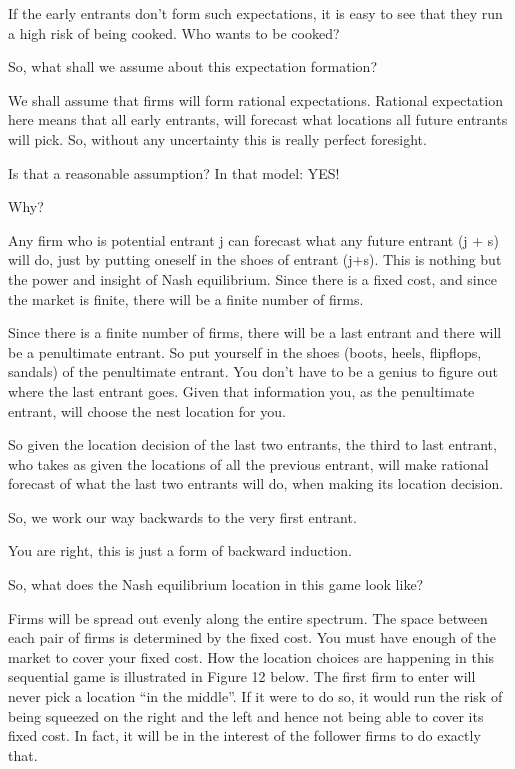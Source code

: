 \documentclass[
]{book}
\begin{document}
If the early entrants don't form such expectations, it is easy to see that they run a high risk of being cooked. Who wants to be cooked?

So, what shall we assume about this expectation formation?

We shall assume that firms will form rational expectations. Rational expectation here means that all early entrants, will forecast what locations all future entrants will pick. So, without any uncertainty this is really perfect foresight.

Is that a reasonable assumption? In that model: YES!

Why?

Any firm who is potential entrant j can forecast what any future entrant (j + s) will do, just by putting oneself in the shoes of entrant (j+s). This is nothing but the power and insight of Nash equilibrium. Since there is a fixed cost, and since the market is finite, there will be a finite number of firms.

Since there is a finite number of firms, there will be a last entrant and there will be a penultimate entrant. So put yourself in the shoes (boots, heels, flipflops, sandals) of the penultimate entrant. You don't have to be a genius to figure out where the last entrant goes. Given that information you, as the penultimate entrant, will choose the nest location for you.

So given the location decision of the last two entrants, the third to last entrant, who takes as given the locations of all the previous entrant, will make rational forecast of what the last two entrants will do, when making its location decision.

So, we work our way backwards to the very first entrant.

You are right, this is just a form of backward induction.

So, what does the Nash equilibrium location in this game look like?

Firms will be spread out evenly along the entire spectrum. The space between each pair of firms is determined by the fixed cost. You must have enough of the market to cover your fixed cost. How the location choices are happening in this sequential game is illustrated in Figure 12 below. The first firm to enter will never pick a location ``in the middle''. If it were to do so, it would run the risk of being squeezed on the right and the left and hence not being able to cover its fixed cost. In fact, it will be in the interest of the follower firms to do exactly that.
\end{document}
